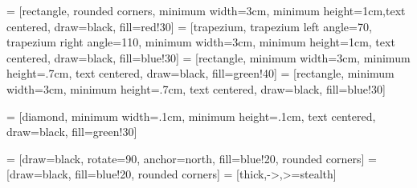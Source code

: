  = [rectangle, rounded corners, minimum width=3cm, minimum height=1cm,text centered, draw=black, fill=red!30]
 = [trapezium, trapezium left angle=70, trapezium right angle=110, minimum width=3cm, minimum height=1cm, text centered, draw=black, fill=blue!30]
 = [rectangle, minimum width=3cm, minimum height=.7cm, text centered, draw=black, fill=green!40]
 = [rectangle, minimum width=3cm, minimum height=.7cm, text centered, draw=black, fill=blue!30]

 = [diamond, minimum width=.1cm, minimum height=.1cm, text centered, draw=black, fill=green!30]

 = [draw=black, rotate=90, anchor=north, fill=blue!20, rounded corners]
 = [draw=black, fill=blue!20, rounded corners]
 = [thick,->,>=stealth]


